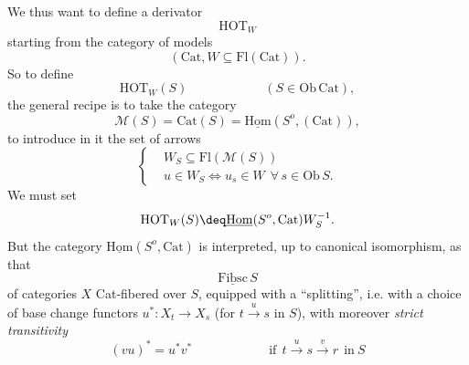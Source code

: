 \noindent We thus want to define a derivator
\[
\mathrm{HOT}_W
\]
starting from the category of models
\[
(\mathrm{Cat}, W \subseteq \mathrm{Fl}(\mathrm{Cat})).
\]
So to define
\[
\mathrm{HOT}_W(S) \qquad\qquad\qquad (S \in \mathrm{Ob}\,\mathrm{Cat}),
\]
the general recipe is to take the category %
\[
\mathcal{M}(S) = \mathrm{Cat}(S) = \underline{\mathrm{Hom}}(S^o, (\mathrm{Cat})),
\]
to introduce in it the set of arrows
\[
\left\{
\begin{aligned}
& W_S \subseteq \mathrm{Fl}(\mathcal{M}(S)) \\
& u \in W_S \Longleftrightarrow u_s \in W \ \ \forall\, s \in \mathrm{Ob}\,S.
\end{aligned}
\right.
\]
We must set
\[
\mathrm{HOT}_W(S) \deq \underline{\mathrm{Hom}}(S^o, \mathrm{Cat})W_S^{-1}.
\]
But the category $\underline{\mathrm{Hom}}(S^o, \mathrm{Cat})$ is interpreted, up to canonical isomorphism, as that
\[
\underline{\mathrm{Fibsc}}\,S
\]
of categories $X$ Cat-fibered over $S$, equipped with a ``splitting'', i.e. with a choice of base change functors $u^* : X_t \longrightarrow X_s$ (for $t \xrightarrow{u} s$ in $S$), with moreover \textit{strict transitivity}
\[
(vu)^* = u^* v^* \qquad\qquad\qquad \text{if}\ \ t \xrightarrow{u} s \xrightarrow{v} r\ \ \text{in}\ S
\]

\noindent{}